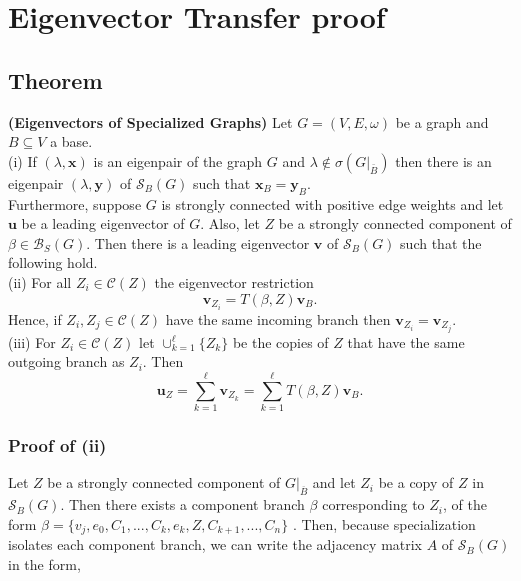 \documentclass{paper}
\begin{document}
\section*{Eigenvector Transfer proof}






\subsection*{Theorem}\textbf{(Eigenvectors of Specialized Graphs)}
Let $G=(V,E,\omega)$ be a graph and $B\subseteq V$ a base.\\
(i) If $(\lambda,\mathbf{x})$ is an eigenpair of the graph $G$ and $\lambda\notin\sigma(G|_{\bar{B}})$ then there is an eigenpair $(\lambda,\mathbf{y})$ of $\mathcal{S}_B(G)$ such that $\mathbf{x}_B=\mathbf{y}_B$.\\
Furthermore, suppose $G$ is strongly connected with positive edge weights and let $\mathbf{u}$ be a leading eigenvector of $G$. Also, let $Z$ be a strongly connected component of $\beta\in\mathcal{B}_S(G)$. Then there is a leading eigenvector $\mathbf{v}$ of $\mathcal{S}_B(G)$ such that the following hold.\\
(ii) For all $Z_i\in\mathcal{C}(Z)$ the eigenvector restriction 
\[
\mathbf{v}_{Z_i}=T(\beta,Z)\mathbf{v}_B.
\] 
Hence, if $Z_i,Z_j\in\mathcal{C}(Z)$ have the same incoming branch then $\mathbf{v}_{Z_i}=\mathbf{v}_{Z_j}$.\\
(iii) For $Z_i\in\mathcal{C}(Z)$ let $\cup_{k=1}^\ell\{Z_k\}$ be the copies of $Z$ that have the same outgoing branch as $Z_i$. Then
\[
\mathbf{u}_Z=\sum_{k=1}^{\ell}\mathbf{v}_{Z_k}=\sum_{k=1}^{\ell}T(\beta,Z)\mathbf{v}_B.
\]


\subsubsection*{Proof of (ii)}
Let $Z$ be a strongly connected component of $G|_{\overline{B}}$ and let $Z_i$ be a copy of $Z$ in $\mathcal{S}_B(G)$. Then there exists a component branch $\beta$ corresponding to $Z_i$, of the form $\beta = \{v_j, e_0, C_1, ..., C_k, e_k, Z, C_{k+1}, ..., C_{n}\}$ . Then, because specialization isolates each component branch, we can write the adjacency matrix $A$ of $\mathcal{S}_B(G)$ in the form,
\end{document}
